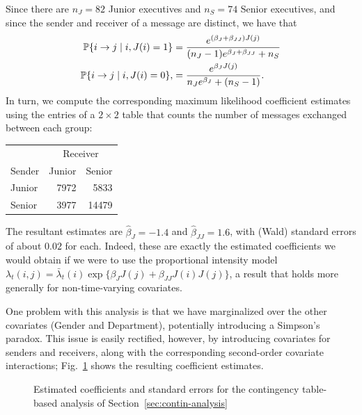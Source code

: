 \documentclass[final]{statsoc}
\begin{document}
Since there are $n_J = 82$ Junior
executives and $n_S = 74$ Senior executives, and since the sender and
receiver of a message are distinct, we have that
\begin{align*}
  \mathbb{P}\{ i \to j \mid i, J(i) = 1 \}
    &=
      \frac{e^{(\beta_J + \beta_{JJ}) J(j)}}
           {(n_J - 1) e^{\beta_J + \beta_{JJ}} + n_S} \\
  \mathbb{P}\{ i \to j \mid i, J(i) = 0 \},
    &=
      \frac{e^{\beta_J J(j)}}
           {n_J e^{\beta_J} + (n_S - 1)}.
\end{align*}
In turn, we compute the corresponding maximum likelihood coefficient estimates using the
entries of a $2 \times 2$ table that counts the number of messages exchanged
between each group:
\begin{center}
\begin{tabular}{lrr}
  \toprule
  & \multicolumn{2}{c}{Receiver} \\
  \cmidrule(l){2-3}
  Sender & Junior & Senior \\
  \midrule
  Junior &  7972  &  5833 \\
  Senior &  3977  & 14479 \\
  \bottomrule
\end{tabular}
\end{center}
The resultant estimates are $\hat \beta_{J} = -1.4$ and
$\hat \beta_{JJ} = 1.6$, with (Wald) standard errors of about $0.02$
for each.  Indeed, these are exactly the estimated coefficients we would
obtain if we were to use the proportional intensity model
$\lambda_t(i,j) = \bar \lambda_t(i) \exp\{ \beta_J J(j) + \beta_{JJ} J(i) J(j)
\}$, a result that holds more generally for non-time-varying covariates.

One problem with this analysis is that we have marginalized over the
other covariates (Gender and Department), potentially introducing a Simpson's
paradox.  This issue is easily rectified, however, by introducing covariates for senders and
receivers, along with the corresponding second-order covariate interactions;
Fig.~\ref{T:group-static} shows the resulting coefficient estimates.

\begin{figure}
  \centering
  \makebox[\textwidth]{
    \scriptsize
    
  }
  \caption{
    Estimated coefficients and standard errors for the contingency table-based analysis of Section~\ref{sec:contin-analysis}
  }
  \label{T:group-static}
\end{figure}
\end{document}

